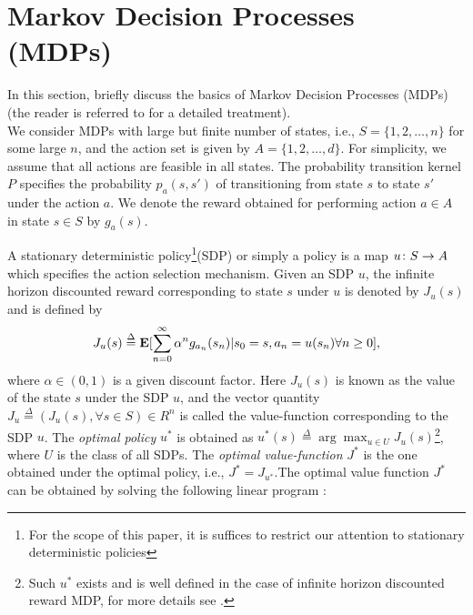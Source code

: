 \section{Markov Decision Processes (MDPs)}
In this section, briefly discuss the basics of Markov Decision Processes (MDPs) (the reader is referred to \cite{BertB,Puter} for a detailed treatment).\\
We consider MDPs with large but finite number of states, i.e., $S=\{1,2,\ldots,n\}$ for some large $n$, and the action set is given by $A=\{1,2,\ldots,d\}$. For simplicity, we assume that all actions are feasible in all states. The probability transition kernel $P$ specifies the probability $p_a(s,s')$ of transitioning from state $s$ to state $s'$ under the action $a$. We denote the reward obtained for performing action $a\in A$ in state $s\in S$ by $g_a(s)$.\par
A stationary deterministic policy\footnote{For the scope of this paper, it is suffices to restrict our attention to stationary deterministic policies}(SDP) or simply a policy is a map $u\colon S\rightarrow A$ which specifies the action selection mechanism. Given an SDP $u$, the infinite horizon discounted reward corresponding to state $s$ under $u$ is denoted by $J_u(s)$ and is defined by
\begin{align}
J_u(s)\stackrel{\Delta}{=}\mathbf{E}[\sum_{n=0}^\infty \alpha^n g_{a_n}(s_n)|s_0=s,a_n=u(s_n)\relax{ }\forall n\geq 0],\nonumber
\end{align}
where $\alpha \in (0,1)$ is a given discount factor. Here $J_u(s)$ is known as the value of the state $s$ under the SDP $u$, and the vector quantity $J_u\stackrel{\Delta}{=}(J_u(s), \forall s\in S)\in R^n$ is called the value-function corresponding to the SDP $u$. The \emph{optimal policy} $u^*$ is obtained as $u^*(s)\stackrel{\Delta}{=}\arg\max_{u\in U}J_u(s)$\footnote{Such $u^*$ exists and is well defined in the case of infinite horizon discounted reward MDP, for more details see \cite{Puter}.}, where $U$ is the class of all SDPs. The \emph{optimal value-function} $J^*$ is the one obtained under the optimal policy, i.e., $J^*=J_{u^*}$.The optimal value function $J^*$ can be obtained by solving the following linear program :
